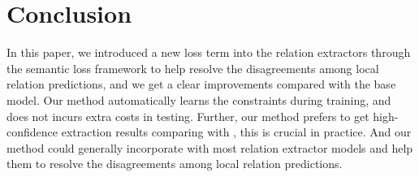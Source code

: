 \section{Conclusion}
In this paper, we introduced a new loss term into the relation extractors through the semantic loss framework to help resolve the disagreements among local relation predictions, and we get a clear improvements compared with the base model. 
Our method automatically learns the constraints during training, and does not incurs extra costs in testing. 
Further, our method prefers to get high-confidence extraction results comparing with \ILP, this is crucial in practice.
And our method could generally incorporate with most relation extractor models and help them to resolve the disagreements among local relation predictions.